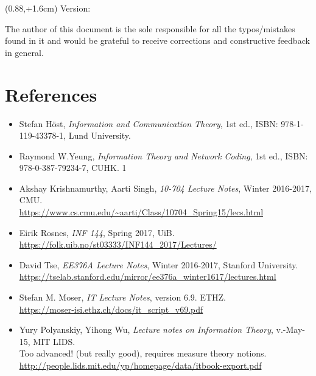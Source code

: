 \documentclass[10pt]{homework}
\newcommand\PlaceText[3]{%
\begin{textblock*}{10in}(#1,#2)  %
#3
\end{textblock*}
}%
\begin{document}
\PlaceText{0.88\textwidth}{\voffset+1.6cm}{Version: \texttt{\detokenize{2023_06_03_0}}}
\mysetupheader
The author of this document is the sole responsible for all the typos/mistakes found in it and would be grateful to receive corrections and constructive feedback in general.
\\[-20pt]
\section*{References}
\begin{itemize}
    \item
    Stefan Höst, \emph{Information and Communication Theory}, 1st ed., ISBN: 978-1-119-43378-1, Lund University.


    \item Raymond W.\@ Yeung, \emph{Information Theory and Network Coding}, 1st ed., ISBN: 978-0-387-79234-7, CUHK.
1
    \item
    Akshay Krishnamurthy, Aarti Singh, \emph{10-704 Lecture Notes}, Winter 2016-2017, CMU.
    \\
    \url{https://www.cs.cmu.edu/~aarti/Class/10704_Spring15/lecs.html}

    \item
    Eirik Rosnes, \emph{INF 144}, Spring 2017, UiB.
    \\
    \url{https://folk.uib.no/st03333/INF144_2017/Lectures/}

    \item
    David Tse, \emph{EE376A Lecture Notes}, Winter 2016-2017, Stanford University.
    \\
    \url{https://tselab.stanford.edu/mirror/ee376a_winter1617/lectures.html}

    \item
    Stefan M. Moser, \emph{IT Lecture Notes}, version 6.9. ETHZ.
    \\
    \url{https://moser-isi.ethz.ch/docs/it_script_v69.pdf}




    \item
    Yury Polyanskiy, Yihong Wu, \emph{Lecture notes on Information Theory}, v.\@{}-May-15, MIT LIDS.
    \\
    Too advanced! (but really good), requires measure theory notions.\\
    \url{http://people.lids.mit.edu/yp/homepage/data/itbook-export.pdf}
\end{itemize}
\end{document}
